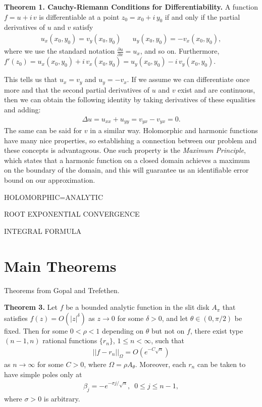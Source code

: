 \documentclass[12]{article}
\begin{document}
	\textbf{Theorem 1. Cauchy-Riemann Conditions for Differentiability.} A function $f=u+i\,v$ is differentiable at a point $z_0=x_0+i\,y_0$ if and only if the partial derivatives of $u$ and $v$ satisfy
	\begin{align*}
u_x(x_0,y_0)=v_y(x_0,y_0) &&
u_y	(x_0,y_0)=-v_x(x_0,y_0),
	\end{align*}
where we use the standard notation $\frac{\partial u}{\partial x}=u_x$, and so on. Furthermore, $f'(z_0)=u_x(x_0,y_0)+i\, v_x(x_0,y_0)=u_y	(x_0,y_0)-i\, v_y(x_0,y_0)$.

	This tells us that $u_x=v_y$ and $u_y=-v_x$. If we assume we can differentiate once more and that the second partial derivatives of $u$ and $v$ exist and are continuous, then we can obtain the following identity by taking derivatives of these equalities and adding:
	\begin{align*}
\Delta u=u_{xx}+u_{yy}=v_{yx}-v_{yx}=0.
	\end{align*}
The same can be said for $v$ in a similar way. Holomorphic and harmonic functions have many nice properties, so establishing a connection between our problem and these concepts is advantageous. One such property is the \textit{Maximum Principle}, which states that a harmonic function on a closed domain achieves a maximum on the boundary of the domain, and this will guarantee us an identifiable error bound on our approximation.

	HOLOMORPHIC=ANALYTIC
	
	ROOT EXPONENTIAL CONVERGENCE
	
	INTEGRAL FORMULA
	
		
	\section{Main Theorems}
	Theorems from Gopal and Trefethen.
	
	\textbf{Theorem 3.} Let $f$ be a bounded analytic function in the slit disk $A_\pi$ that satisfies $f(z)=O(|z|^\delta)$ as $z \to 0$ for some $\delta > 0$, and let $\theta \in (0,\pi /2)$ be fixed. Then for some $0< \rho < 1$ depending on $\theta$ but not on $f$, there exist type $(n-1,n)$ rational functions $\{r_n\}$, $1 \leq n < \infty$, such that
	\begin{align*}
||f-r_n||_\Omega = O(e^{-C \sqrt{n}})
	\end{align*}
as $n \to \infty $ for some $C>0$, where $\Omega = \rho A_\theta$. Moreover, each $r_n$ can be taken to have simple poles only at
	\begin{align*}
\beta_j = -e^{-\sigma j/\sqrt{n}}, \enspace 0\leq j \leq n-1,
	\end{align*}
where $\sigma >0$ is arbitrary.
\end{document}
